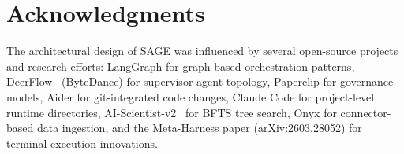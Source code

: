 \documentclass[11pt,a4paper]{article}
\begin{document}
\section*{Acknowledgments}

The architectural design of SAGE was influenced by several open-source projects and research efforts: LangGraph for graph-based orchestration patterns, DeerFlow~\citep{deerflow2025} (ByteDance) for supervisor-agent topology, Paperclip for governance models, Aider for git-integrated code changes, Claude Code for project-level runtime directories, AI-Scientist-v2~\citep{aiscientistv2} for BFTS tree search, Onyx for connector-based data ingestion, and the Meta-Harness paper (arXiv:2603.28052) for terminal execution innovations.



\end{document}
